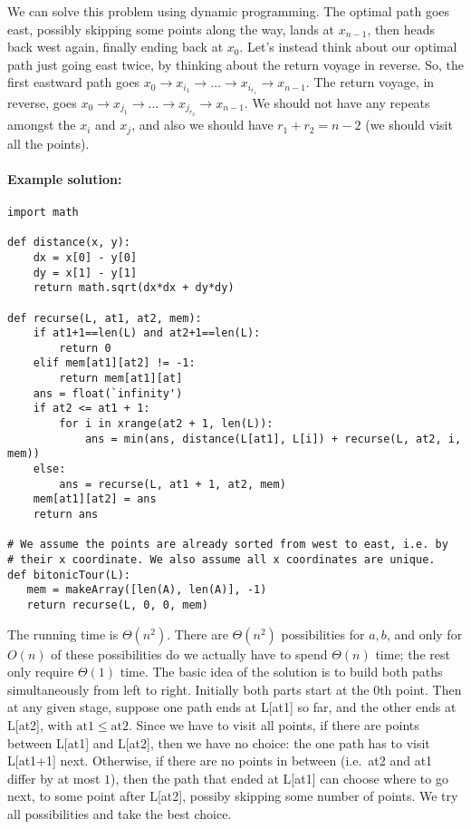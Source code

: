 \documentclass[11pt]{article}
\begin{document}
We can solve this problem using dynamic programming.  The optimal path
goes east, possibly skipping some points along
the way, lands at $x_{n-1}$, then heads back west again, finally
ending back at $x_0$.  Let's instead think about our optimal path just
going east twice, by thinking about the return voyage in reverse.  So,
the first eastward path goes $x_0\rightarrow x_{i_1} \rightarrow
 \ldots \rightarrow x_{i_{r_1}} \rightarrow x_{n-1}$.  The return voyage,
in reverse, goes $x_0\rightarrow x_{j_1}\rightarrow \ldots \rightarrow
x_{j_{r_2}} \rightarrow x_{n-1}$.  We should not have any repeats
amongst the $x_i$ and $x_j$, and also we should have $r_1 + r_2 = n-2$
(we should visit all the points).

\paragraph{Example solution:}
\begin{verbatim}
import math

def distance(x, y):
    dx = x[0] - y[0]
    dy = x[1] - y[1]
    return math.sqrt(dx*dx + dy*dy)

def recurse(L, at1, at2, mem):
    if at1+1==len(L) and at2+1==len(L):
        return 0
    elif mem[at1][at2] != -1:
        return mem[at1][at]
    ans = float(`infinity')
    if at2 <= at1 + 1:
        for i in xrange(at2 + 1, len(L)):
            ans = min(ans, distance(L[at1], L[i]) + recurse(L, at2, i, mem))
    else:
        ans = recurse(L, at1 + 1, at2, mem)
    mem[at1][at2] = ans
    return ans
    
# We assume the points are already sorted from west to east, i.e. by
# their x coordinate. We also assume all x coordinates are unique.
def bitonicTour(L):
   mem = makeArray([len(A), len(A)], -1)
   return recurse(L, 0, 0, mem)
\end{verbatim}

The running time is $\Theta(n^2)$.  
There are $\Theta(n^2)$ possibilities for $a,b$, and only for $O(n)$ of these possibilities do we actually have to spend $\Theta(n)$ time; the rest only require $\Theta(1)$ time.
The basic idea of the solution is
to build both paths simultaneously from left to right.  Initially both
parts start at the $0$th point.  Then at any given stage, suppose one
path ends at L[at1] so far, and the other ends at L[at2], with
$\mathrm{at1}\le\mathrm{at2}$.  Since we have to visit all points, if
there are points between L[at1] and L[at2], then we have no choice:
the one path has to visit L[at1+1] next.  Otherwise, if there are no
points in between (i.e.\ at2 and at1 differ by at most $1$), then the
path that ended at L[at1] can choose where to go next, to some point
after L[at2], possiby skipping some number of points.  We try all
possibilities and take the best choice.
\end{document}

